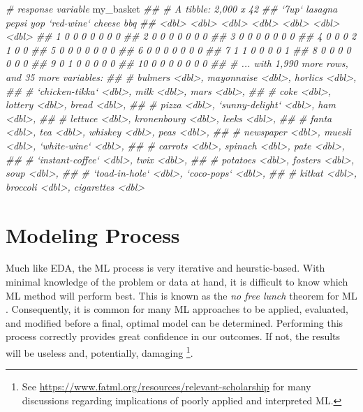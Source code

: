 \documentclass[]{krantz}
\makeatletter
\newenvironment{Shaded}{\begin{snugshade}}{\end{snugshade}}
\newcommand{\CommentTok}[1]{\textcolor[rgb]{0.37,0.37,0.37}{\textit{#1}}}
\newcommand{\NormalTok}[1]{#1}
\newenvironment{kframe}{%
\medskip{}
\setlength{\fboxsep}{.8em}
 \def\at@end@of@kframe{}%
 \ifinner\ifhmode%
  \def\at@end@of@kframe{\end{minipage}}%
  \begin{minipage}{\columnwidth}%
 \fi\fi%
 \def\FrameCommand##1{\hskip\@totalleftmargin \hskip-\fboxsep
 \colorbox{shadecolor}{##1}\hskip-\fboxsep
     \hskip-\linewidth \hskip-\@totalleftmargin \hskip\columnwidth}%
 \MakeFramed {\advance\hsize-\width
   \@totalleftmargin\z@ \linewidth\hsize
   \@setminipage}}%
 {\par\unskip\endMakeFramed%
 \at@end@of@kframe}
\renewenvironment{Shaded}{\begin{kframe}}{\end{kframe}}
\makeatother
\begin{document}
\begin{itemize}
\begin{Shaded}
\begin{Highlighting}[]
\CommentTok{# response variable}
\NormalTok{my_basket}
\CommentTok{## # A tibble: 2,000 x 42}
\CommentTok{##    `7up` lasagna pepsi   yop `red-wine` cheese   bbq}
\CommentTok{##    <dbl>   <dbl> <dbl> <dbl>      <dbl>  <dbl> <dbl>}
\CommentTok{##  1     0       0     0     0          0      0     0}
\CommentTok{##  2     0       0     0     0          0      0     0}
\CommentTok{##  3     0       0     0     0          0      0     0}
\CommentTok{##  4     0       0     0     2          1      0     0}
\CommentTok{##  5     0       0     0     0          0      0     0}
\CommentTok{##  6     0       0     0     0          0      0     0}
\CommentTok{##  7     1       1     0     0          0      0     1}
\CommentTok{##  8     0       0     0     0          0      0     0}
\CommentTok{##  9     0       1     0     0          0      0     0}
\CommentTok{## 10     0       0     0     0          0      0     0}
\CommentTok{## # ... with 1,990 more rows, and 35 more variables:}
\CommentTok{## #   bulmers <dbl>, mayonnaise <dbl>, horlics <dbl>,}
\CommentTok{## #   `chicken-tikka` <dbl>, milk <dbl>, mars <dbl>,}
\CommentTok{## #   coke <dbl>, lottery <dbl>, bread <dbl>,}
\CommentTok{## #   pizza <dbl>, `sunny-delight` <dbl>, ham <dbl>,}
\CommentTok{## #   lettuce <dbl>, kronenbourg <dbl>, leeks <dbl>,}
\CommentTok{## #   fanta <dbl>, tea <dbl>, whiskey <dbl>, peas <dbl>,}
\CommentTok{## #   newspaper <dbl>, muesli <dbl>, `white-wine` <dbl>,}
\CommentTok{## #   carrots <dbl>, spinach <dbl>, pate <dbl>,}
\CommentTok{## #   `instant-coffee` <dbl>, twix <dbl>,}
\CommentTok{## #   potatoes <dbl>, fosters <dbl>, soup <dbl>,}
\CommentTok{## #   `toad-in-hole` <dbl>, `coco-pops` <dbl>,}
\CommentTok{## #   kitkat <dbl>, broccoli <dbl>, cigarettes <dbl>}
\end{Highlighting}
\end{Shaded}
\end{itemize}

\hypertarget{process}{%
\chapter{Modeling Process}\label{process}}

Much like EDA, the ML process is very iterative and heurstic-based. With minimal knowledge of the problem or data at hand, it is difficult to know which ML method will perform best. This is known as the \emph{no free lunch} theorem for ML \citep{wolpert1996lack}. Consequently, it is common for many ML approaches to be applied, evaluated, and modified before a final, optimal model can be determined. Performing this process correctly provides great confidence in our outcomes. If not, the results will be useless and, potentially, damaging \footnote{See \url{https://www.fatml.org/resources/relevant-scholarship} for many discussions regarding implications of poorly applied and interpreted ML.}.
\end{document}
